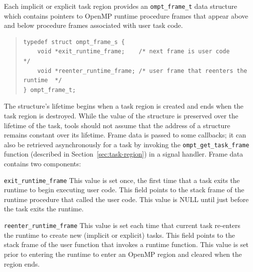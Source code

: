 \documentclass{article}
\begin{document}
  Each implicit or explicit task region provides an \verb|ompt_frame_t| data structure
  which contains pointers to OpenMP runtime procedure frames that
  appear above and below procedure frames associated with user task
  code. 
  
\begin{quote}
\begin{verbatim}
typedef struct ompt_frame_s {
    void *exit_runtime_frame;    /* next frame is user code     */
    void *reenter_runtime_frame; /* user frame that reenters the runtime  */
} ompt_frame_t;
\end{verbatim}
\end{quote}

\noindent
The structure's lifetime begins when a task region is
  created and ends when the task region is destroyed.  While the
  value of the structure is preserved over the lifetime of the task,
  tools should not assume that the address of a structure remains
  constant over its lifetime.
  Frame data is passed to some callbacks; it can also be retrieved
  asynchronously
  for a task by invoking the \verb|ompt_get_task_frame|  function (described in Section~\ref{sec:task-region}) in a signal handler.
  Frame data contains two components:

\begin{description}
\item \verb|exit_runtime_frame|
     This value is set once, the first time that a task exits  
     the runtime to begin executing user code. This field
     points to the stack frame of the runtime procedure that 
     called the user code. This value is NULL until just before
     the task exits the runtime.
  
\item \verb|reenter_runtime_frame|
     This value is set each time that current task re-enters the 
     runtime to create new (implicit or explicit) tasks. This field 
     points to the stack frame of the user function that invokes a runtime function.  
     This value is set prior to entering the runtime to enter an OpenMP region and cleared when the region ends. 

\end{description}
\end{document}

